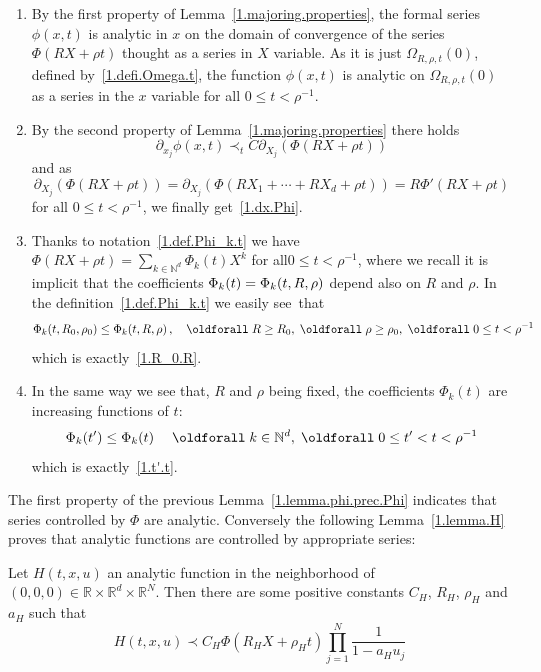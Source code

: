 \documentclass[AHL,Unicode,longabstracts,published]{cedram}
\theoremstyle{plain}
\newcommand*\R{{\mathbb R}}
\newcommand*\N{{\mathbb N}}
\newcommand{\dptl}{\partial}%
\newcommand*\dsp{\displaystyle}
\renewcommand*{\forall}{\mathrel{\oldforall}}
\begin{document}
\begin{proofc}
\begin{enumerate}
\item[\eqref{lem4.4.1}] By the first property of Lemma~\ref{1.majoring.properties}, the formal series $\phi(x,t)$ is analytic in $x$ on the domain of convergence of the series $\Phi(RX + \rho t)$ thought as a series in $X$ variable. As it is just $\Omega_{R,\rho,t}(0)$, defined by~\eqref{1.defi.Omega.t}, the function $\phi(x,t)$ is analytic on $\Omega_{R,\rho,t}(0)$ as a series in the $x$ variable for all $0\leq t < \rho^{-1}$.

\item[\eqref{lem4.4.2}] By the second property of Lemma~\ref{1.majoring.properties} there holds
\[
 \dptl_{x_j}\phi(x,t) \prec_{t} C\dptl_{X_j} \left(\Phi(RX+\rho t)\right)
\] 
and as
\[
\dptl_{X_j} \left(\Phi(RX+\rho t)\right) = \dptl_{X_j} \left(\Phi(RX_1 + \cdots + RX_{d} +\rho t)\right) = R\Phi'(RX+\rho t)
\]
for all $0\leq t < \rho^{-1}$, we finally get~\eqref{1.dx.Phi}.

\item[\eqref{lem4.4.3}] Thanks to notation~\eqref{1.def.Phi_k.t} we have $\Phi(RX + \rho t) = \sum_{k\in\N^{d}} \Phi_{k}(t) X^{k} $ for all\linebreak$0 \leq t < \rho^{-1}$, where we recall it is implicit that the coefficients $\Phi_{k}(t)\linebreak= \Phi_{k}(t,R,\rho)$ depend also on $R$ and $\rho$. In the definition~\eqref{1.def.Phi_k.t} we easily see~that
\[
\Phi_{k}(t,R_0,\rho_0) \leq \Phi_{k}(t,R,\rho)\,, \quad \forall R\geq R_0,\; \forall \rho \geq \rho_0,\; \forall 0 \leq t < \rho^{-1}
\]
which is exactly~\eqref{1.R_0.R}.

\item[\eqref{lem4.4.4}] In the same way we see that, $ R$ and $\rho$ being fixed, the coefficients $\Phi_{k}(t)$ are increasing functions of $t$:
\[
\Phi_{k}(t') \leq \Phi_{k}(t) \quad \forall k\in\N^{d}, \; \forall 0 \leq t' < t < \rho^{-1}
\]
which is exactly~\eqref{1.t'.t}.
\end{enumerate}
\end{proofc}

The first property of the previous Lemma~\ref{1.lemma.phi.prec.Phi} indicates that series controlled by $\Phi$ are analytic. Conversely the following Lemma~\ref{1.lemma.H} proves that analytic functions are controlled by appropriate series:

\begin{lemm}\label{1.lemma.H}
Let $H(t,x,u)$ an analytic function in the neighborhood of\linebreak$(0,0,0)\in\R\times\R^{d}\times\R^{N}$. Then there are some positive constants $C_{H}$, $R_H$, $\rho_H$ and $a_H$ such that
\begin{equation}\label{1.prec.H}
H(t,x,u) \prec C_H \Phi(R_H X + \rho_H t) \prod_{j=1}^{N}\frac{\dsp 1}{1 - a_H u_j}
\end{equation}
\end{lemm}
\end{document}
